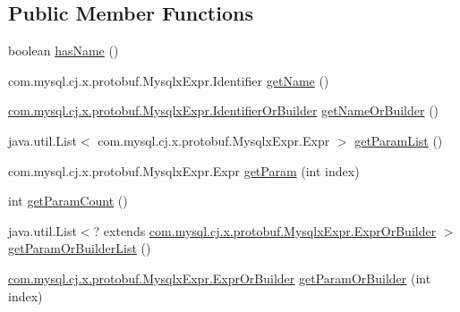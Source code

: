 \subsection*{Public Member Functions}
\begin{DoxyCompactItemize}
\item 
boolean \mbox{\hyperlink{interfacecom_1_1mysql_1_1cj_1_1x_1_1protobuf_1_1_mysqlx_expr_1_1_function_call_or_builder_a5cc0eeeb9b19399ddfae95d2eabe3702}{has\+Name}} ()
\item 
com.\+mysql.\+cj.\+x.\+protobuf.\+Mysqlx\+Expr.\+Identifier \mbox{\hyperlink{interfacecom_1_1mysql_1_1cj_1_1x_1_1protobuf_1_1_mysqlx_expr_1_1_function_call_or_builder_a815801037f54dd2fe08343b2fb6b21a4}{get\+Name}} ()
\item 
\mbox{\hyperlink{interfacecom_1_1mysql_1_1cj_1_1x_1_1protobuf_1_1_mysqlx_expr_1_1_identifier_or_builder}{com.\+mysql.\+cj.\+x.\+protobuf.\+Mysqlx\+Expr.\+Identifier\+Or\+Builder}} \mbox{\hyperlink{interfacecom_1_1mysql_1_1cj_1_1x_1_1protobuf_1_1_mysqlx_expr_1_1_function_call_or_builder_adc0b6bb23b251d8002f23066e2a094d7}{get\+Name\+Or\+Builder}} ()
\item 
java.\+util.\+List$<$ com.\+mysql.\+cj.\+x.\+protobuf.\+Mysqlx\+Expr.\+Expr $>$ \mbox{\hyperlink{interfacecom_1_1mysql_1_1cj_1_1x_1_1protobuf_1_1_mysqlx_expr_1_1_function_call_or_builder_a7d6d59d6b5a670a7bfdf60d227ec540c}{get\+Param\+List}} ()
\item 
com.\+mysql.\+cj.\+x.\+protobuf.\+Mysqlx\+Expr.\+Expr \mbox{\hyperlink{interfacecom_1_1mysql_1_1cj_1_1x_1_1protobuf_1_1_mysqlx_expr_1_1_function_call_or_builder_a4b2a6dfff405e068ce064d287b8f4703}{get\+Param}} (int index)
\item 
int \mbox{\hyperlink{interfacecom_1_1mysql_1_1cj_1_1x_1_1protobuf_1_1_mysqlx_expr_1_1_function_call_or_builder_a53aa00e67397869faac7813a8c6549f0}{get\+Param\+Count}} ()
\item 
java.\+util.\+List$<$? extends \mbox{\hyperlink{interfacecom_1_1mysql_1_1cj_1_1x_1_1protobuf_1_1_mysqlx_expr_1_1_expr_or_builder}{com.\+mysql.\+cj.\+x.\+protobuf.\+Mysqlx\+Expr.\+Expr\+Or\+Builder}} $>$ \mbox{\hyperlink{interfacecom_1_1mysql_1_1cj_1_1x_1_1protobuf_1_1_mysqlx_expr_1_1_function_call_or_builder_a230f6b470418815597b157cd1b318a39}{get\+Param\+Or\+Builder\+List}} ()
\item 
\mbox{\hyperlink{interfacecom_1_1mysql_1_1cj_1_1x_1_1protobuf_1_1_mysqlx_expr_1_1_expr_or_builder}{com.\+mysql.\+cj.\+x.\+protobuf.\+Mysqlx\+Expr.\+Expr\+Or\+Builder}} \mbox{\hyperlink{interfacecom_1_1mysql_1_1cj_1_1x_1_1protobuf_1_1_mysqlx_expr_1_1_function_call_or_builder_a4e6e93dadade64d05f51ed9f9f579491}{get\+Param\+Or\+Builder}} (int index)
\end{DoxyCompactItemize}


